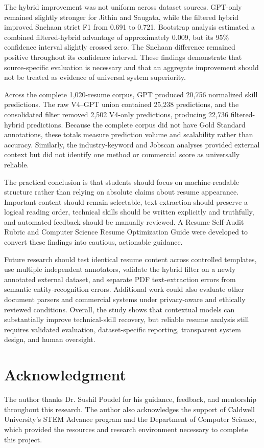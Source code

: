 \documentclass[conference]{IEEEtran}
\begin{document}
The hybrid improvement was not uniform across dataset sources. GPT-only
remained slightly stronger for Jithin and Saugata, while the filtered
hybrid improved Snehaan strict F1 from 0.691 to 0.721. Bootstrap analysis
estimated a combined filtered-hybrid advantage of approximately 0.009,
but its 95\% confidence interval slightly crossed zero. The Snehaan
difference remained positive throughout its confidence interval. These
findings demonstrate that source-specific evaluation is necessary and
that an aggregate improvement should not be treated as evidence of
universal system superiority.

Across the complete 1,020-resume corpus, GPT produced 20,756 normalized
skill predictions. The raw V4--GPT union contained 25,238 predictions,
and the consolidated filter removed 2,502 V4-only predictions, producing
22,736 filtered-hybrid predictions. Because the complete corpus did not
have Gold Standard annotations, these totals measure prediction volume
and scalability rather than accuracy. Similarly, the industry-keyword
and Jobscan analyses provided external context but did not identify one
method or commercial score as universally reliable.

The practical conclusion is that students should focus on
machine-readable structure rather than relying on absolute claims about
resume appearance. Important content should remain selectable, text
extraction should preserve a logical reading order, technical skills
should be written explicitly and truthfully, and automated feedback
should be manually reviewed. A Resume Self-Audit Rubric and Computer
Science Resume Optimization Guide were developed to convert these
findings into cautious, actionable guidance.

Future research should test identical resume content across controlled
templates, use multiple independent annotators, validate the hybrid filter
on a newly annotated external dataset, and separate PDF text-extraction
errors from semantic entity-recognition errors. Additional work could
also evaluate other document parsers and commercial systems under
privacy-aware and ethically reviewed conditions. Overall, the study shows
that contextual models can substantially improve technical-skill
recovery, but reliable resume analysis still requires validated
evaluation, dataset-specific reporting, transparent system design, and
human oversight.

\section*{Acknowledgment}

The author thanks Dr. Sushil Poudel for his guidance, feedback, and
mentorship throughout this research. The author also acknowledges the
support of Caldwell University's STEM Advance program and the Department
of Computer Science, which provided the resources and research
environment necessary to complete this project.



\end{document}
